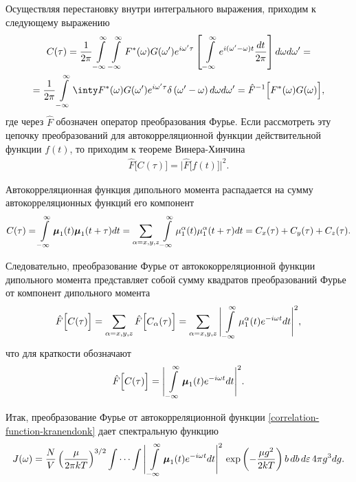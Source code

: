 Осуществляя перестановку внутри интегрального выражения, приходим к следующему выражению 
\begin{gather}
    C(\tau) = \frac{1}{2\pi} \intty \intty F^*(\omega) G(\omega^\prime) e^{i \omega^\prime \tau} \lsq \, \intty e^{i (\omega^\prime - \omega) t} \frac{dt}{2 \pi} \rsq d\omega d\omega^\prime = \notag \\
    = \frac{1}{2\pi} \intty \inty F^*(\omega) G(\omega^\prime) e^{i \omega^\prime \tau} \delta \lb \omega^\prime - \omega \rb d\omega d\omega^\prime = \hat{F}^{-1} \Big[ F^*(\omega) G(\omega) \Big],
\end{gather}
%
где через $\hat{F}$ обозначен оператор преобразования Фурье. Если рассмотреть эту цепочку преобразований для автокорреляционной функции действительной функции $f(t)$, то приходим к теореме Винера-Хинчина \cite{frommhold}
\begin{gather}
    \hat{F} \Big[ C(\tau) \Big] = \Big\vert \hat{F}\Big[ f(t) \Big] \Big\vert^2. 
\end{gather}

Автокорреляционная функция дипольного момента распадается на сумму автокорреляционных функций его компонент
\begin{gather}
    C(\tau) = \int\limits_{-\infty}^\infty \boldsymbol{\mu}_1(t) \boldsymbol{\mu}_1(t + \tau) dt = \sum_{\alpha = x, y, z} \int\limits_{-\infty}^\infty \mu_1^\alpha(t) \mu_1^\alpha(t + \tau) dt = C_x(\tau) + C_y(\tau) + C_z(\tau).
\end{gather}

Следовательно, преобразование Фурье от автококорреляционной функции дипольного момента представляет собой сумму квадратов преобразований Фурье от компонент дипольного момента
\begin{gather}
    \hat{F}\Big[ C(\tau) \Big] = \sum_{\alpha = x,y,z} \hat{F} \Big[ C_\alpha(\tau) \Big] = \sum_{\alpha=x,y,z} \Bigg\vert \int\limits_{-\infty}^\infty \mu_1^\alpha(t) e^{-i\omega t} dt \Bigg\vert^2,
\end{gather}
% 
что для краткости обозначают 
\begin{gather}
    \hat{F} \Big[ C(\tau) \Big] = \Bigg\vert \int\limits_{-\infty}^\infty \boldsymbol{\mu}_1(t) e^{-i\omega t} dt \Bigg\vert^2. \label{correlation-theorem}
\end{gather}

Итак, преобразование Фурье от автокорреляционной функции \eqref{correlation-function-kranendonk} дает спектральную функцию  
\begin{gather}
    J(\omega) = \frac{N}{V} \left( \frac{\mu}{2 \pi k T} \right)^{3/2} \idotsint \Bigg\vert \int\limits_{-\infty}^\infty \boldsymbol{\mu}_1(t) e^{-i \omega t} dt \Bigg\vert^2 \, \exp \left( -\frac{\mu g^2}{2 k T} \right) b \, db \, d \varepsilon \, 4 \pi g^3 dg.
\end{gather}

